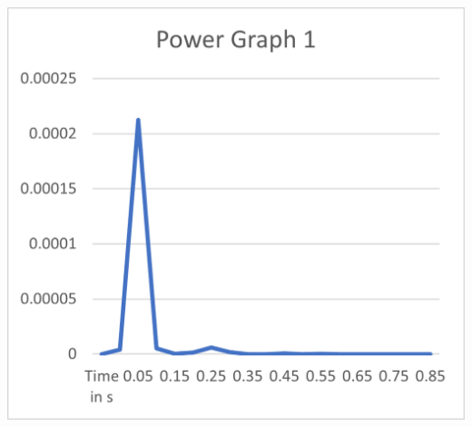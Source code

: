 \begin{minipage}{0.5\textwidth}
    \includegraphics[width=\textwidth]{./Figure_14.png}
    \label{fig:Power Graph 1}
\end{minipage}

